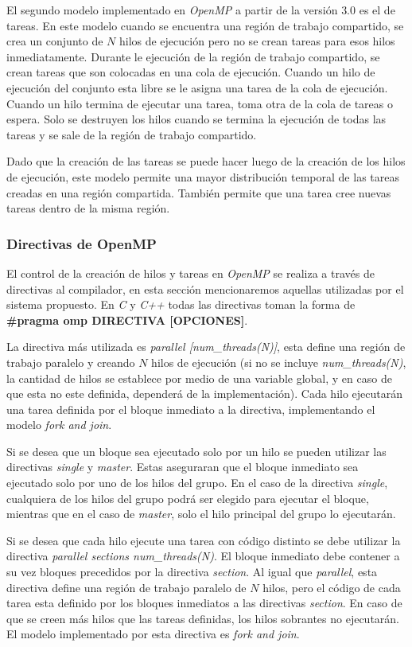 El segundo modelo implementado en \emph{OpenMP} a partir de la versión $3.0$ es
el de tareas. En este modelo cuando se encuentra una región de trabajo
compartido, se crea un conjunto de $N$ hilos de ejecución pero no se crean
tareas para esos hilos inmediatamente. Durante le ejecución de la región de
trabajo compartido, se crean tareas que son colocadas en una cola de ejecución.
Cuando un hilo de ejecución del conjunto esta libre se le asigna una tarea de la
cola de ejecución. Cuando un hilo termina de ejecutar una tarea, toma otra de la
cola de tareas o espera. Solo se destruyen los hilos cuando se termina la
ejecución de todas las tareas y se sale de la región de trabajo compartido.

Dado que la creación de las tareas se puede hacer luego de la creación de los
hilos de ejecución, este modelo permite una mayor distribución temporal de las
tareas creadas en una región compartida. También permite que una tarea cree
nuevas tareas dentro de la misma región.

\subsubsection{Directivas de OpenMP}

El control de la creación de hilos y tareas en \emph{OpenMP} se realiza a través
de directivas al compilador, en esta sección mencionaremos aquellas utilizadas
por el sistema propuesto. En \emph{C} y \emph{C++} todas las directivas toman la
forma de \textbf{\#pragma omp DIRECTIVA [OPCIONES]}.

La directiva más utilizada es \emph{parallel [num\_threads(N)]}, esta define una
región de trabajo paralelo y creando $N$ hilos de ejecución (si no se incluye
\emph{num\_threads(N)}, la cantidad de hilos se establece por medio de una
variable global, y en caso de que esta no este definida, dependerá de la
implementación). Cada hilo ejecutarán una tarea definida por el bloque inmediato
a la directiva, implementando el modelo \emph{fork and join}.

Si se desea que un bloque sea ejecutado solo por un hilo se pueden utilizar las
directivas \emph{single} y \emph{master}. Estas aseguraran que el bloque
inmediato sea ejecutado solo por uno de los hilos del grupo. En el caso de la
directiva \emph{single}, cualquiera de los hilos del grupo podrá ser elegido
para ejecutar el bloque, mientras que en el caso de \emph{master}, solo el
hilo principal del grupo lo ejecutarán.

Si se desea que cada hilo ejecute una tarea con código distinto se debe utilizar
la directiva \emph{parallel sections num\_threads(N)}. El bloque inmediato debe
contener a su vez bloques precedidos por la directiva \emph{section}. Al igual
que \emph{parallel}, esta directiva define una región de trabajo paralelo de $N$
hilos, pero el código de cada tarea esta definido por los bloques inmediatos a
las directivas \emph{section}. En caso de que se creen más hilos que las tareas
definidas, los hilos sobrantes no ejecutarán. El modelo implementado por esta
directiva es \emph{fork and join}.

